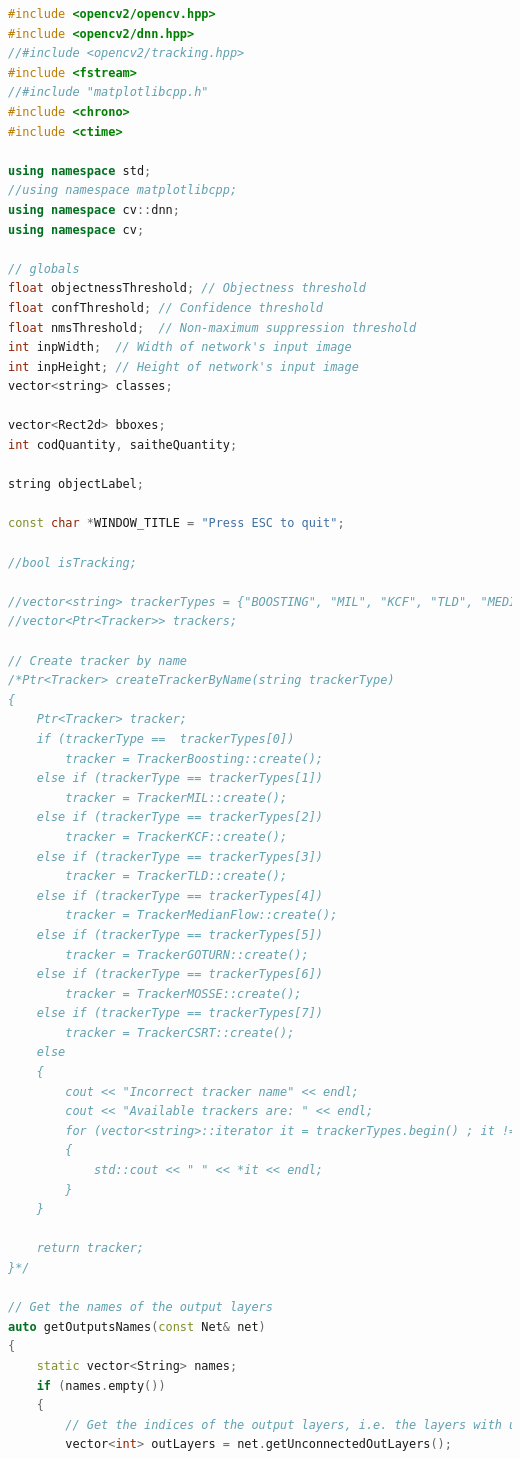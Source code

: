 \begin{lstlisting}[language=C++, caption=main.cpp]
#include <opencv2/opencv.hpp>
#include <opencv2/dnn.hpp>
//#include <opencv2/tracking.hpp>
#include <fstream>
//#include "matplotlibcpp.h"
#include <chrono>
#include <ctime>

using namespace std;
//using namespace matplotlibcpp;
using namespace cv::dnn;
using namespace cv;

// globals
float objectnessThreshold; // Objectness threshold
float confThreshold; // Confidence threshold
float nmsThreshold;  // Non-maximum suppression threshold
int inpWidth;  // Width of network's input image
int inpHeight; // Height of network's input image
vector<string> classes;

vector<Rect2d> bboxes;
int codQuantity, saitheQuantity;

string objectLabel;

const char *WINDOW_TITLE = "Press ESC to quit";

//bool isTracking;

//vector<string> trackerTypes = {"BOOSTING", "MIL", "KCF", "TLD", "MEDIANFLOW", "GOTURN", "MOSSE", "CSRT"};
//vector<Ptr<Tracker>> trackers;

// Create tracker by name
/*Ptr<Tracker> createTrackerByName(string trackerType)
{
    Ptr<Tracker> tracker;
    if (trackerType ==  trackerTypes[0])
        tracker = TrackerBoosting::create();
    else if (trackerType == trackerTypes[1])
        tracker = TrackerMIL::create();
    else if (trackerType == trackerTypes[2])
        tracker = TrackerKCF::create();
    else if (trackerType == trackerTypes[3])
        tracker = TrackerTLD::create();
    else if (trackerType == trackerTypes[4])
        tracker = TrackerMedianFlow::create();
    else if (trackerType == trackerTypes[5])
        tracker = TrackerGOTURN::create();
    else if (trackerType == trackerTypes[6])
        tracker = TrackerMOSSE::create();
    else if (trackerType == trackerTypes[7])
        tracker = TrackerCSRT::create();
    else
    {
        cout << "Incorrect tracker name" << endl;
        cout << "Available trackers are: " << endl;
        for (vector<string>::iterator it = trackerTypes.begin() ; it != trackerTypes.end(); ++it)
        {
            std::cout << " " << *it << endl;
        }
    }

    return tracker;
}*/

// Get the names of the output layers
auto getOutputsNames(const Net& net)
{
    static vector<String> names;
    if (names.empty())
    {
        // Get the indices of the output layers, i.e. the layers with unconnected outputs
        vector<int> outLayers = net.getUnconnectedOutLayers();


\end{lstlisting}

